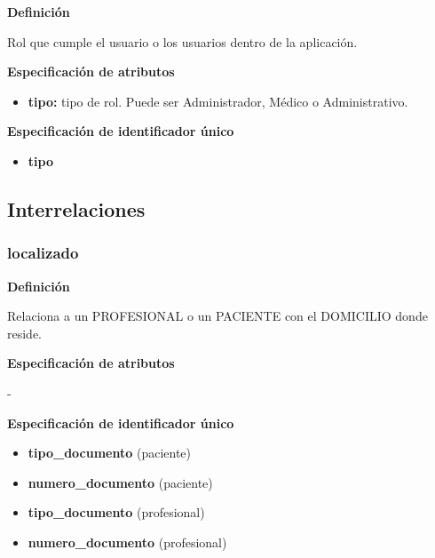 \documentclass[a4paper,11pt]{article}
\begin{document}
\textbf{Definición}

Rol que cumple el usuario o los usuarios dentro de la aplicación.

\textbf{Especificación de atributos}

\begin{itemize}

     \item \textbf{tipo:} tipo de rol. Puede ser Administrador, Médico o Administrativo. 

\end{itemize}

\textbf{Especificación de identificador único}

\begin{itemize}

     \item \textbf{tipo}

\end{itemize}



\subsection{\textbf{Interrelaciones}}

\subsubsection{\textbf{localizado}}

\textbf{Definición}

Relaciona a un PROFESIONAL o un PACIENTE con el DOMICILIO donde reside.

\textbf{Especificación de atributos}

-

\textbf{Especificación de identificador único}

\begin{itemize}

     \item \textbf{tipo\_documento} (paciente)

     \item \textbf{numero\_documento} (paciente)

     \item \textbf{tipo\_documento} (profesional)

     \item \textbf{numero\_documento} (profesional)

\end{itemize}
\end{document}
